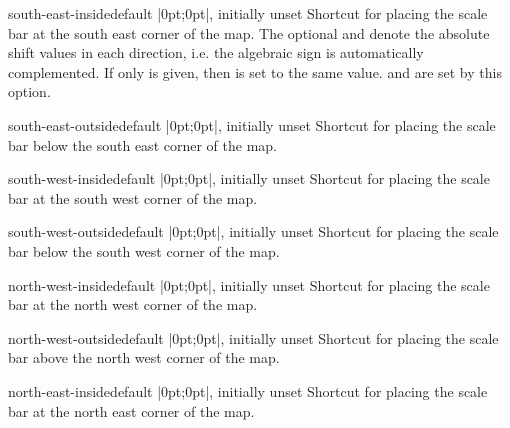 \begin{docMrcKey}[scalebar]{south-east-inside}{}{default |0pt;0pt|, initially unset}
  Shortcut for placing the scale bar at the south east corner of the map.
  The optional \mbox{} and  denote the
  absolute shift values in each direction, i.e. the algebraic sign is
  automatically complemented.
  If only  is given, then  is set
  to the same value.  and 
  are set by this option.
\end{docMrcKey}

\begin{docMrcKey}[scalebar]{south-east-outside}{}{default |0pt;0pt|, initially unset}
  Shortcut for placing the scale bar below the south east corner of the map.
\end{docMrcKey}

\begin{docMrcKey}[scalebar]{south-west-inside}{}{default |0pt;0pt|, initially unset}
  Shortcut for placing the scale bar at the south west corner of the map.
\end{docMrcKey}

\begin{docMrcKey}[scalebar]{south-west-outside}{}{default |0pt;0pt|, initially unset}
  Shortcut for placing the scale bar below the south west corner of the map.
\end{docMrcKey}

\begin{docMrcKey}[scalebar]{north-west-inside}{}{default |0pt;0pt|, initially unset}
  Shortcut for placing the scale bar at the north west corner of the map.
\end{docMrcKey}

\begin{docMrcKey}[scalebar]{north-west-outside}{}{default |0pt;0pt|, initially unset}
  Shortcut for placing the scale bar above the north west corner of the map.
\end{docMrcKey}

\begin{docMrcKey}[scalebar]{north-east-inside}{}{default |0pt;0pt|, initially unset}
  Shortcut for placing the scale bar at the north east corner of the map.
\end{docMrcKey}

